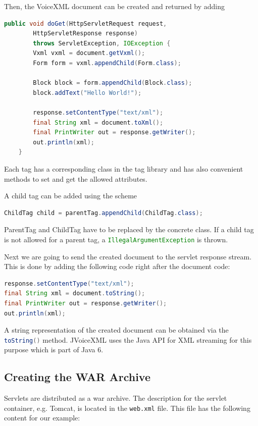 \documentclass[11pt,a4paper]{book}
\begin{document}
Then, the VoiceXML document can be created and returned by adding
\begin{lstlisting}[language=Java]
    public void doGet(HttpServletRequest request,
        HttpServletResponse response)
        throws ServletException, IOException {
        Vxml vxml = document.getVxml();
        Form form = vxml.appendChild(Form.class);

        Block block = form.appendChild(Block.class);
        block.addText("Hello World!");

        response.setContentType("text/xml");
        final String xml = document.toXml();
        final PrintWriter out = response.getWriter();
        out.println(xml);
    }
\end{lstlisting}

Each tag has a corresponding class in the tag library and has also convenient
methods to set and get the allowed attributes.

A child tag can be added using the scheme
\begin{lstlisting}[language=Java]
ChildTag child = parentTag.appendChild(ChildTag.class);
\end{lstlisting}

ParentTag and ChildTag have to be replaced by the concrete class. If a child
tag is not allowed for a parent tag, a \lstinline[language=Java]{IllegalArgumentException} is
thrown.

Next we are going to send the created document to the servlet response stream.
This is done by adding the following code right after the document code:

\begin{lstlisting}[language=Java]
response.setContentType("text/xml");
final String xml = document.toString();
final PrintWriter out = response.getWriter();
out.println(xml);
\end{lstlisting}

A string representation of the created document can be obtained via the
\lstinline[language=Java]{toString()} method. JVoiceXML uses the Java API for
XML streaming for this purpose which is part of Java 6.

\subsection{Creating the WAR Archive}

Servlets are distributed as a war archive. The description for the servlet
container, e.g. Tomcat, is located in the \texttt{web.xml} file.
This file has the following content for our example:
\end{document}
